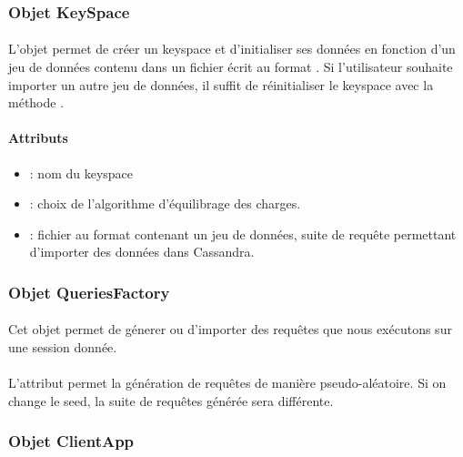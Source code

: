 \documentclass[12pt]{article}
\begin{document}
\subsubsection{ Objet KeySpace }

\paragraph{} L'objet  permet de créer un keyspace et d'initialiser ses données en fonction d'un jeu de données contenu dans un fichier  écrit au format .
Si l'utilisateur souhaite importer un autre jeu de données, il suffit de réinitialiser le keyspace avec la méthode .

\paragraph{Attributs}
\begin{itemize}
 \item {} : nom du keyspace
 \item {} : choix de l'algorithme d'équilibrage des charges.
 \item {} : fichier au format  contenant un jeu de données, suite de requête permettant d'importer des données dans Cassandra.
\end{itemize}


\subsubsection{ Objet QueriesFactory }

\paragraph{} Cet objet permet de génerer ou d'importer des requêtes  que nous exécutons sur une session donnée.

\paragraph{} L'attribut  permet la génération de requêtes de manière pseudo-aléatoire. 
Si on change le seed, la suite de requêtes générée sera différente.

\subsubsection{ Objet ClientApp }
\end{document}
